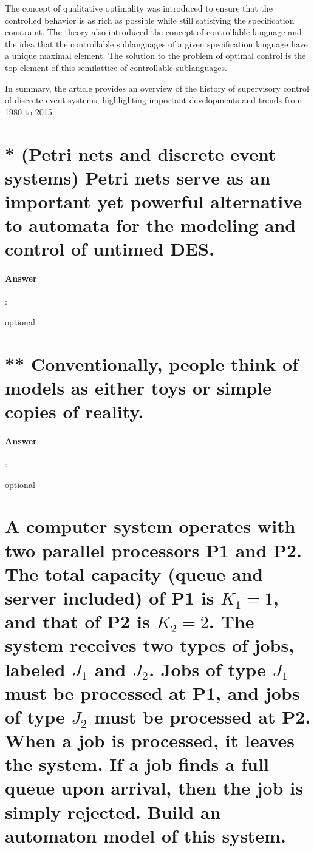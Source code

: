 \documentclass{article}
\begin{document}
The concept of qualitative optimality was introduced to ensure that the controlled behavior is as rich as possible while still satisfying the specification constraint. The theory also introduced the concept of controllable language and the idea that the controllable sublanguages of a given specification language have a unique maximal element. The solution to the problem of optimal control is the top element of this semilattice of controllable sublanguages.

In summary, the article provides an overview of the history of supervisory control of discrete-event systems, highlighting important developments and trends from 1980 to 2015.

\section{* (Petri nets and discrete event systems) Petri nets serve as an important yet powerful alternative to automata for the modeling and control of untimed DES.}

\paragraph{Answer}:

optional

\section{** Conventionally, people think of models as either toys or simple copies of reality.}

\paragraph{Answer}:

optional

\section{A computer system operates with two parallel processors P1 and P2. The total capacity (queue and server included) of P1 is $K_1 = 1$, and that of P2 is $K_2 = 2$. The system receives two types of jobs, labeled $J_1$ and $J_2$. Jobs of type $J_1$ must be processed at P1, and jobs of type $J_2$ must be processed at P2. When a job is processed, it leaves the system. If a job finds a full queue upon arrival, then the job is simply rejected. Build an automaton model of this system.}
\end{document}
